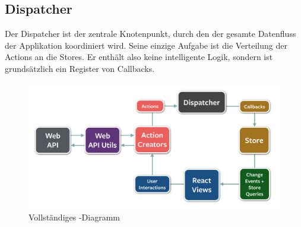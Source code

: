 \subsection{Dispatcher}
\label{pd-flux-dispatcher}
Der Dispatcher ist der zentrale Knotenpunkt, durch den der gesamte Datenfluss der Applikation koordiniert wird.
Seine einzige Aufgabe ist die Verteilung der Actions an die Stores.
Er enthält also keine intelligente Logik, sondern ist grundsätzlich ein Register von Callbacks.\newline
\begin{figure}[H]
 	\centering
 	\includegraphics[width=\textwidth]{images/projektdokumentation/flux-diagram.png}
 	\caption{Vollständiges -Diagramm}
 	\label{image-flux-overview-detailed}
\end{figure}